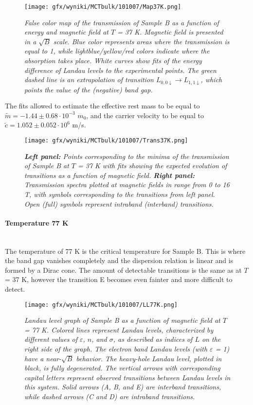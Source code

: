 \documentclass[titlepage,a4paper]{book}
\newcommand{\wciecie}{\quad\phantom{v}}
\newcommand{\myparagraph}[1]{\paragraph{#1}\mbox{}\\}
\begin{document}
\begin{figure}[ht]
	\centering
	\texttt{[image: gfx/wyniki/MCTbulk/101007/Map37K.png]}
	\vspace{-10pt}
	\caption{\textit{False color map of the transmission of Sample B as a function of energy and magnetic field at $T$ = 37 K. Magnetic field is presented in a $\sqrt{B}$ scale. Blue color represents areas where the transmission is equal to 1, while lightblue/yellow/red colors indicate where the absorption takes place. White curves show fits of the energy difference of Landau levels to the experimental points. The green dashed line is an extrapolation of transition $L_{0,0\downarrow}\rightarrow L_{1,1\downarrow}$, which points the value of the (negative) band gap.}}
	\label{fig:Map_101007_37K}
\end{figure} 

The fits allowed to estimate the effective rest mass to be equal to $\tilde m = -1.44 \pm 0.68 \cdot 10^{-3}$ $m_0$, and the carrier velocity to be equal to $\tilde{c} = 1.052 \pm 0.052 \cdot 10^6$ m/s.

\begin{figure}[H]
	\centering
	\texttt{[image: gfx/wyniki/MCTbulk/101007/Trans37K.png]}
	\vspace{-10pt}
	\caption{\textit{\textbf{Left panel:} Points corresponding to the minima of the transmission of Sample B at $T$ = 37 K with fits showing the expected evolution of transitions as a function of magnetic field. \textbf{Right panel:} Transmission spectra plotted at magnetic fields in range from 0 to 16 T, with symbols corresponding to the transitions from left panel. Open (full) symbols represent intraband (interband) transitions.}}
	\label{fig:Spectra_101007_37K}
\end{figure}  

\myparagraph{Temperature 77 K}
\wciecie
The temperature of 77 K is the critical temperature for Sample B. This is where the band gap vanishes completely and the dispersion relation is linear and is formed by a Dirac cone. The amount of detectable transitions is the same as at $T$ = 37 K, however the transition E becomes even fainter and more difficult to detect. 
\begin{figure}[ht]
	\centering
	\texttt{[image: gfx/wyniki/MCTbulk/101007/LL77K.png]}
	\vspace{-10pt}
	\caption{\textit{Landau level graph of Sample B as a function of magnetic field at $T$ = 77 K. Colored lines represent Landau levels, characterized by different values of $\varepsilon$, $n$, and $\sigma$, as described as indices of $L$ on the right side of the graph. The electron band Landau levels (with $\varepsilon$ = 1) have a near-$\sqrt{B}$ behavior. The heavy-hole Landau level, plotted in black, is fully degenerated. The vertical arrows with corresponding capital letters represent observed transitions between Landau levels in this system. Solid arrows (A, B, and E) are interband transitions, while dashed arrows (C and D) are intraband transitions.}}
	\label{fig:LL_101007_77K}
\end{figure}
\end{document}
